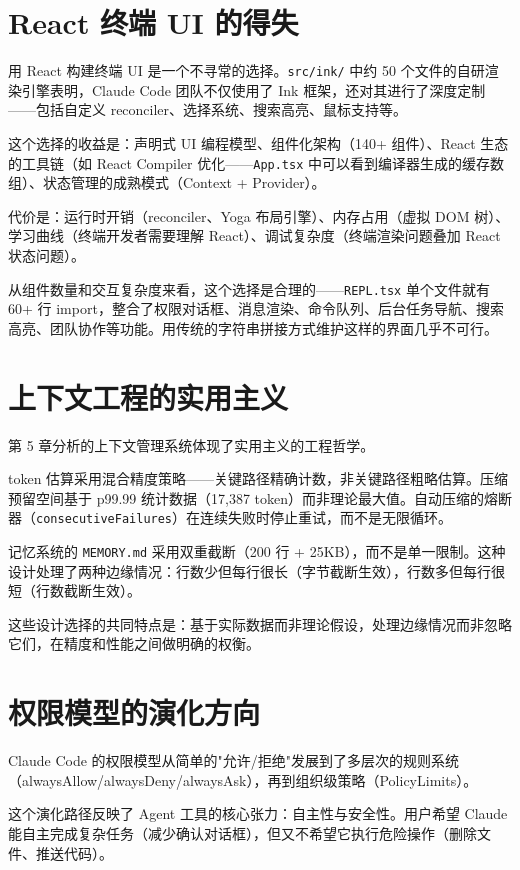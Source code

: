 \section{React 终端 UI 的得失}

用 React 构建终端 UI 是一个不寻常的选择。\texttt{src/ink/} 中约 50 个文件的自研渲染引擎表明，Claude Code 团队不仅使用了 Ink 框架，还对其进行了深度定制——包括自定义 reconciler、选择系统、搜索高亮、鼠标支持等。

这个选择的收益是：声明式 UI 编程模型、组件化架构（140+ 组件）、React 生态的工具链（如 React Compiler 优化——\texttt{App.tsx} 中可以看到编译器生成的缓存数组）、状态管理的成熟模式（Context + Provider）。

代价是：运行时开销（reconciler、Yoga 布局引擎）、内存占用（虚拟 DOM 树）、学习曲线（终端开发者需要理解 React）、调试复杂度（终端渲染问题叠加 React 状态问题）。

从组件数量和交互复杂度来看，这个选择是合理的——\texttt{REPL.tsx} 单个文件就有 60+ 行 import，整合了权限对话框、消息渲染、命令队列、后台任务导航、搜索高亮、团队协作等功能。用传统的字符串拼接方式维护这样的界面几乎不可行。

\section{上下文工程的实用主义}

第 5 章分析的上下文管理系统体现了实用主义的工程哲学。

token 估算采用混合精度策略——关键路径精确计数，非关键路径粗略估算。压缩预留空间基于 p99.99 统计数据（17,387 token）而非理论最大值。自动压缩的熔断器（\texttt{consecutiveFailures}）在连续失败时停止重试，而不是无限循环。

记忆系统的 \texttt{MEMORY.md} 采用双重截断（200 行 + 25KB），而不是单一限制。这种设计处理了两种边缘情况：行数少但每行很长（字节截断生效），行数多但每行很短（行数截断生效）。

这些设计选择的共同特点是：基于实际数据而非理论假设，处理边缘情况而非忽略它们，在精度和性能之间做明确的权衡。

\section{权限模型的演化方向}

Claude Code 的权限模型从简单的"允许/拒绝"发展到了多层次的规则系统（alwaysAllow/alwaysDeny/alwaysAsk），再到组织级策略（PolicyLimits）。

这个演化路径反映了 Agent 工具的核心张力：自主性与安全性。用户希望 Claude 能自主完成复杂任务（减少确认对话框），但又不希望它执行危险操作（删除文件、推送代码）。

